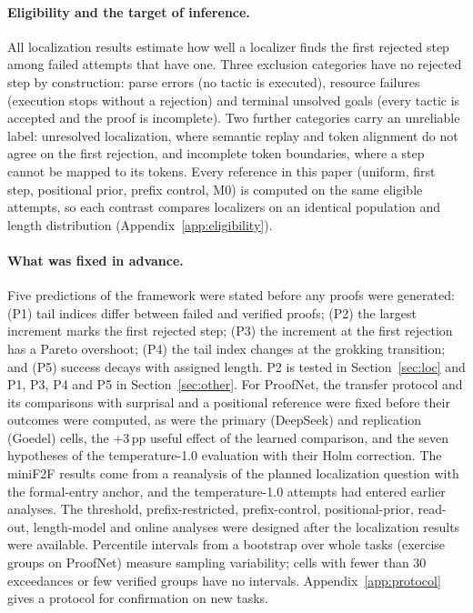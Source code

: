 \documentclass{article}
\newcommand{\1}{\mathbf{1}}
\begin{document}
\paragraph{Eligibility and the target of inference.} All localization results estimate how well a localizer finds the first rejected step among failed attempts that have one. Three exclusion categories have no rejected step by construction: parse errors (no tactic is executed), resource failures (execution stops without a rejection) and terminal unsolved goals (every tactic is accepted and the proof is incomplete). Two further categories carry an unreliable label: unresolved localization, where semantic replay and token alignment do not agree on the first rejection, and incomplete token boundaries, where a step cannot be mapped to its tokens. Every reference in this paper (uniform, first step, positional prior, prefix control, M0) is computed on the same eligible attempts, so each contrast compares localizers on an identical population and length distribution (Appendix~\ref{app:eligibility}).

\paragraph{What was fixed in advance.} Five predictions of the framework were stated before any proofs were generated: (P1) tail indices differ between failed and verified proofs; (P2) the largest increment marks the first rejected step; (P3) the increment at the first rejection has a Pareto overshoot; (P4) the tail index changes at the grokking transition; and (P5) success decays with assigned length. P2 is tested in Section~\ref{sec:loc} and P1, P3, P4 and P5 in Section~\ref{sec:other}. For ProofNet, the transfer protocol and its comparisons with surprisal and a positional reference were fixed before their outcomes were computed, as were the primary (DeepSeek) and replication (Goedel) cells, the +3\,pp useful effect of the learned comparison, and the seven hypotheses of the temperature-1.0 evaluation with their Holm correction. The miniF2F results come from a reanalysis of the planned localization question with the formal-entry anchor, and the temperature-1.0 attempts had entered earlier analyses. The threshold, prefix-restricted, prefix-control, positional-prior, read-out, length-model and online analyses were designed after the localization results were available. Percentile intervals from a bootstrap over whole tasks (exercise groups on ProofNet) measure sampling variability; cells with fewer than 30 exceedances or few verified groups have no intervals. Appendix~\ref{app:protocol} gives a protocol for confirmation on new tasks.





\clearpage
\appendix


\end{document}
